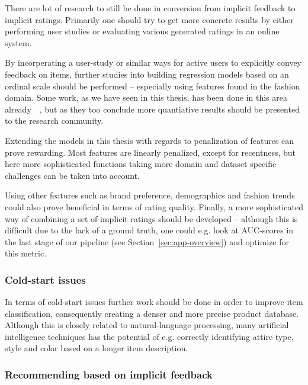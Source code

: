 There are lot of research to still be done in conversion from implicit feedback
to implicit ratings. Primarily one should try to get more concrete results by
either performing user studies or evaluating various generated ratings in an
online system.

By incorperating a user-study or similar ways for active users to explicitly
convey feedback on items, further studies into building regression models based
on an ordinal scale should be performed -- especially using features found in
the fashion domain. Some work, as we have seen in this thesis, has been done in
this area already~\cite{parra2011walk}~\cite{parra2011implicit}, but as they
too conclude more quantiative results should be presented to the research
community.

Extending the models in this thesis with regards to penalization of features
can prove rewarding. Most features are linearly penalized, except for
recentness, but here more sophisticated functions taking more domain and
dataset specific challenges can be taken into account.

Using other features such as brand preference, demographics and fashion trends
could also prove beneficial in terms of rating quality. Finally, a more
sophisticated way of combining a set of implicit ratings should be developed --
although this is difficult due to the lack of a ground truth, one could e.g.
look at AUC-scores in the last stage of our pipeline (see
Sectian~\ref{sec:app-overview}) and optimize for this metric.

\subsubsection{Cold-start issues}

In terms of cold-start issues further work should be done in order to improve
item classification, consequently creating a denser and more precise product
database. Although this is closely related to natural-language processing, many
artificial intelligence techniques has the potential of e.g. correctly
identifying attire type, style and color based on a longer item description.


\subsubsection{Recommending based on implicit feedback}

